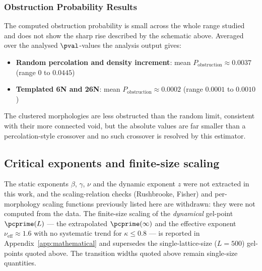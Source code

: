 \subsubsection{Obstruction Probability Results}
The computed obstruction probability is small across the whole range studied and does not show the sharp rise described by the schematic above. Averaged over the analysed $\pval$-values the analysis output gives:

\begin{itemize}
    \item \textbf{Random percolation and density increment}: mean $P_{\text{obstruction}} \approx 0.0037$ (range $0$ to $0.0445$)
    \item \textbf{Templated 6N and 26N}: mean $P_{\text{obstruction}} \approx 0.0002$ (range $0.0001$ to $0.0010$)
\end{itemize}

The clustered morphologies are less obstructed than the random limit, consistent with their more connected void, but the absolute values are far smaller than a percolation-style crossover and no such crossover is resolved by this estimator.

\subsection{Critical exponents and finite-size scaling}

The static exponents $\beta$, $\gamma$, $\nu$ and the dynamic exponent $z$ were not extracted in this work, and the scaling-relation checks (Rushbrooke, Fisher) and per-morphology scaling functions previously listed here are withdrawn: they were not computed from the data. The finite-size scaling of the \emph{dynamical} gel-point $\pcprime(L)$ --- the extrapolated $\pcprime(\infty)$ and the effective exponent $\nu_{\mathrm{eff}} \approx 1.6$ with no systematic trend for $\kappa \le 0.8$ --- is reported in Appendix~\ref{app:mathematical} and supersedes the single-lattice-size ($L = 500$) gel-points quoted above. The transition widths quoted above remain single-size quantities.
